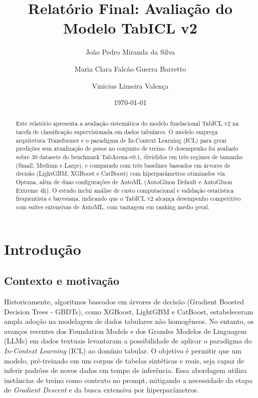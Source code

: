 \documentclass[12pt,a4paper]{article}
\title{Relatório Final: Avaliação do Modelo TabICL v2}
\author{João Pedro Miranda da Silva \and Maria Clara Falcão Guerra Barretto \and Vinicius Limeira Valença}
\date{\today}
\begin{document}
\maketitle

\begin{abstract}
Este relatório apresenta a avaliação sistemática do modelo fundacional TabICL v2 na tarefa de classificação supervisionada em dados tabulares. O modelo emprega arquitetura Transformer e o paradigma de In-Context Learning (ICL) para gerar predições sem atualização de pesos no conjunto de treino. O desempenho foi avaliado sobre 30 datasets do benchmark TabArena-v0.1, divididos em três regimes de tamanho (Small, Medium e Large), e comparado com três baselines baseados em árvores de decisão (LightGBM, XGBoost e CatBoost) com hiperparâmetros otimizados via Optuna, além de duas configurações de AutoML (AutoGluon Default e AutoGluon Extreme 4h). O estudo inclui análise de custo computacional e validação estatística frequentista e bayesiana, indicando que o TabICL v2 alcança desempenho competitivo com suítes extensivas de AutoML, com vantagem em ranking médio geral.
\end{abstract}

\newpage
\tableofcontents

\newpage
\hypersetup{pageanchor=true}
\setcounter{page}{1}
\onehalfspacing

\section{Introdução}

\subsection{Contexto e motivação}
Historicamente, algoritmos baseados em árvores de decisão (Gradient Boosted Decision Trees - GBDTs), como XGBoost, LightGBM e CatBoost, estabeleceram ampla adoção na modelagem de dados tabulares não homogêneos. No entanto, os avanços recentes dos Foundation Models e dos Grandes Modelos de Linguagem (LLMs) em dados textuais levantaram a possibilidade de aplicar o paradigma do \textit{In-Context Learning} (ICL) ao domínio tabular. O objetivo é permitir que um modelo, pré-treinado em um corpus de tabelas sintéticas e reais, seja capaz de inferir padrões de novos dados em tempo de inferência. Essa abordagem utiliza instâncias de treino como contexto no prompt, mitigando a necessidade da etapa de \textit{Gradient Descent} e da busca extensiva por hiperparâmetros.
\end{document}
